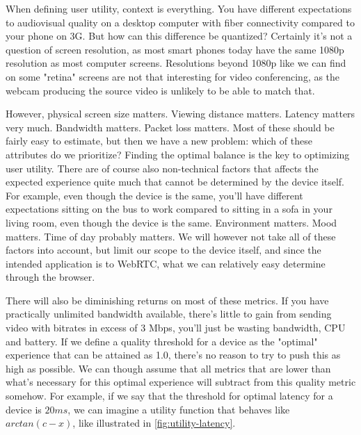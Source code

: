 When defining user utility, context is everything. You have different expectations to audiovisual quality on a desktop computer with fiber connectivity compared to your phone on 3G. But how can this difference be quantized? Certainly it's not a question of screen resolution, as most smart phones today have the same 1080p resolution as most computer screens. Resolutions beyond 1080p like we can find on some "retina" screens are not that interesting for video conferencing, as the webcam producing the source video is unlikely to be able to match that.

However, physical screen size matters. Viewing distance matters. Latency matters very much. Bandwidth matters. Packet loss matters. Most of these should be fairly easy to estimate, but then we have a new problem: which of these attributes do we prioritize? Finding the optimal balance is the key to optimizing user utility. There are of course also non-technical factors that affects the expected experience quite much that cannot be determined by the device itself. For example, even though the device is the same, you'll have different expectations sitting on the bus to work compared to sitting in a sofa in your living room, even though the device is the same. Environment matters. Mood matters. Time of day probably matters. We will however not take all of these factors into account, but limit our scope to the device itself, and since the intended application is to WebRTC, what we can relatively easy determine through the browser.

There will also be diminishing returns on most of these metrics. If you have practically unlimited bandwidth available, there's little to gain from sending video with bitrates in excess of 3 Mbps, you'll just be wasting bandwidth, CPU and battery. If we define a quality threshold for a device as the "optimal" experience that can be attained as 1.0, there's no reason to try to push this as high as possible. We can though assume that all metrics that are lower than what's necessary for this optimal experience will subtract from this quality metric somehow. For example, if we say that the threshold for optimal latency for a device is \(20ms\), we can imagine a \gls{utility function} that behaves like \(arctan(c-x)\), like illustrated in \autoref{fig:utility-latency}.


